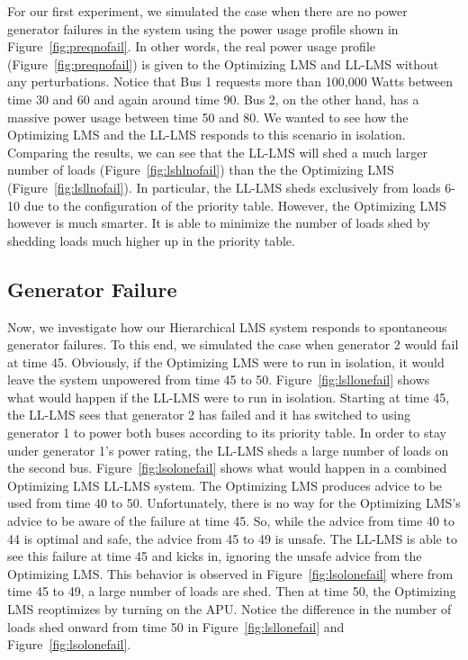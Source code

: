 \documentclass{acm_proc_article-sp}
\begin{document}
For our first experiment, we simulated the case when there are no power
generator failures in the system using the power usage profile shown in
Figure~\ref{fig:preqnofail}. 
In other words, the real power usage profile (Figure~\ref{fig:preqnofail}) is given to the Optimizing LMS and LL-LMS without any perturbations.
Notice that Bus 1 requests more than 100,000 Watts
between time 30 and 60 and again around time 90. Bus 2, on the other hand,
has a massive power usage between time 50 and 80. We wanted to see how the
Optimizing LMS and the LL-LMS responds to this scenario in isolation. 
Comparing the results, we can see that the LL-LMS will shed a much larger
number of loads (Figure~\ref{fig:lshlnofail}) than the the Optimizing LMS (Figure~\ref{fig:lsllnofail}). 
In particular, the LL-LMS sheds exclusively from loads 6-10 due to the configuration of the priority table.
However, the Optimizing LMS however is much smarter. 
It is able to minimize the number of loads shed by shedding loads much higher up in the priority table.

\subsection{Generator Failure}
Now, we investigate how our Hierarchical LMS system responds to spontaneous generator failures. 
To this end, we
simulated the case when generator 2 would fail at time 45. Obviously, if the Optimizing LMS were
to run in isolation, it would leave the system unpowered from time 45 to 50. 
Figure~\ref{fig:lsllonefail} shows what would happen if the LL-LMS were to run in 
isolation. Starting at time 45, the LL-LMS sees that generator 2 has failed and it has 
switched to using generator 1 to power both buses according to its priority table. In order
to stay under generator 1's power rating, the LL-LMS sheds a large number of loads on the 
second bus. Figure~\ref{fig:lsolonefail} shows what would happen in a combined Optimizing LMS
LL-LMS system. The Optimizing LMS produces advice to be used from time 40 to 50. Unfortunately,
there is no way for the Optimizing LMS's advice to be aware of the failure at time 45. So, while the advice
from time 40 to 44 is optimal and safe, the advice from 45 to 49 is unsafe. The LL-LMS is
able to see this failure at time 45 and kicks in, ignoring the unsafe advice from the Optimizing LMS. This
behavior is observed in Figure~\ref{fig:lsolonefail} where from time 45 to 49, a large
number of loads are shed. Then at time 50, the Optimizing LMS reoptimizes by turning on the APU.
Notice the difference in the number of loads shed onward from time 50 in 
Figure~\ref{fig:lsllonefail} and Figure~\ref{fig:lsolonefail}.
\end{document}
